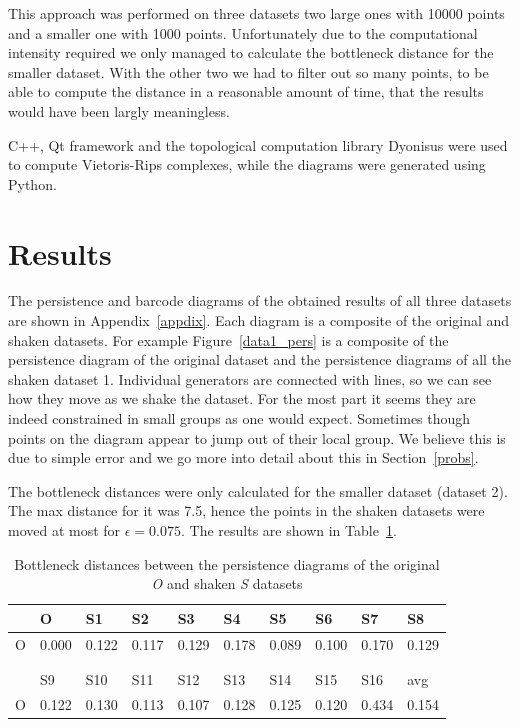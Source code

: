 \documentclass[11pt]{article}
\begin{document}
This approach was performed on three datasets two large ones with 10000 points and a smaller one with 1000 points. Unfortunately due to the computational intensity required we only managed to calculate the bottleneck distance for the smaller dataset. With the other two we had to filter out so many points, to be able to compute the distance in a reasonable amount of time, that the results would have been largly meaningless. 

C++, Qt framework\cite{qt} and the topological computation library Dyonisus\cite{dionysus} were used to compute Vietoris-Rips complexes, while the diagrams were generated using Python\cite{python}.

\section{Results}

The persistence and barcode diagrams of the obtained results of all three datasets are shown in Appendix~\ref{appdix}. Each diagram is a composite of the original and shaken datasets. For example Figure~\ref{data1_pers} is a composite of the persistence diagram of the original dataset and the persistence diagrams of all the shaken dataset 1. Individual generators are connected with lines, so we can see how they move as we shake the dataset. For the most part it seems they are indeed constrained in small groups as one would expect. Sometimes though points on the diagram appear to jump out of their local group. We believe this is due to simple error and we go more into detail about this in Section~\ref{probs}.

The bottleneck distances were only calculated for the smaller dataset (dataset 2). The max distance for it was 7.5, hence the points in the shaken datasets were moved at most for $\epsilon = 0.075$. The results are shown in Table~\ref{tab:bottle_dist}. 

\begin{table}[H]
	\begin{tabular}{llllllllll}
		& O & S1 & S2 & S3 & S4 & S5 & S6 & S7 & S8 \\
		\hline
		O & 0.000 & 0.122 & 0.117 & 0.129 & 0.178 & 0.089 & 0.100 & 0.170 & 0.129 \\
		\\
		\\
		& S9 & S10 & S11 & S12 & S13 & S14 & S15 & S16 & avg \\
		\hline
		O& 0.122 & 0.130 & 0.113 & 0.107 & 0.128 & 0.125 & 0.120 & 0.434 & 0.154\\
	\end{tabular}
	\caption{Bottleneck distances between the persistence diagrams of the original \emph{O} and shaken \emph{S} datasets}
	\label{tab:bottle_dist}
\end{table}
\end{document}
